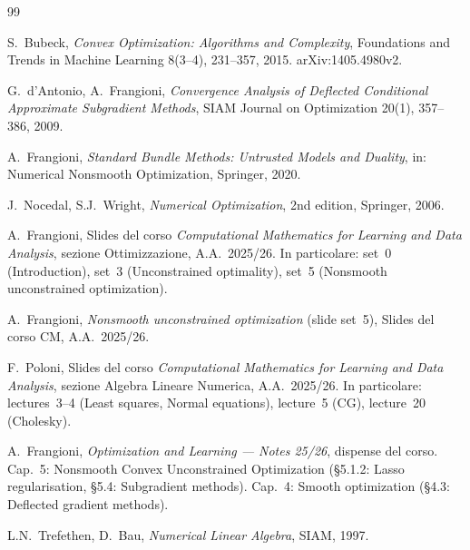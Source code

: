 \documentclass[a4paper,11pt]{article}
\theoremstyle{definition}
\begin{document}
\begin{thebibliography}{99}

S.\ Bubeck, \emph{Convex Optimization: Algorithms and Complexity}, Foundations and Trends in Machine Learning 8(3--4), 231--357, 2015. arXiv:1405.4980v2.

G.\ d'Antonio, A.\ Frangioni, \emph{Convergence Analysis of Deflected Conditional Approximate Subgradient Methods}, SIAM Journal on Optimization 20(1), 357--386, 2009.

A.\ Frangioni, \emph{Standard Bundle Methods: Untrusted Models and Duality}, in: Numerical Nonsmooth Optimization, Springer, 2020.

J.\ Nocedal, S.J.\ Wright, \emph{Numerical Optimization}, 2nd edition, Springer, 2006.

A.\ Frangioni, Slides del corso \emph{Computational Mathematics for Learning and Data Analysis}, sezione Ottimizzazione, A.A.\ 2025/26. In particolare: set~0 (Introduction), set~3 (Unconstrained optimality), set~5 (Nonsmooth unconstrained optimization).

A.\ Frangioni, \emph{Nonsmooth unconstrained optimization} (slide set~5), Slides del corso CM, A.A.\ 2025/26.

F.\ Poloni, Slides del corso \emph{Computational Mathematics for Learning and Data Analysis}, sezione Algebra Lineare Numerica, A.A.\ 2025/26. In particolare: lectures~3--4 (Least squares, Normal equations), lecture~5 (CG), lecture~20 (Cholesky).

A.\ Frangioni, \emph{Optimization and Learning --- Notes 25/26}, dispense del corso. Cap.~5: Nonsmooth Convex Unconstrained Optimization (\S5.1.2: Lasso regularisation, \S5.4: Subgradient methods). Cap.~4: Smooth optimization (\S4.3: Deflected gradient methods).

L.N.\ Trefethen, D.\ Bau, \emph{Numerical Linear Algebra}, SIAM, 1997.

\end{thebibliography}
\end{document}
